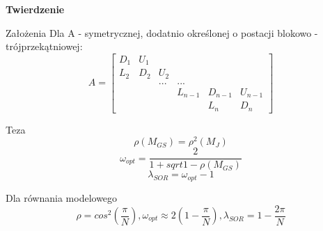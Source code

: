 \begin{frame}{}
  \textbf{Twierdzenie}
  \begin{block}{Założenia}
    Dla A - symetrycznej, dodatnio określonej o postacji blokowo - trójprzekątniowej:
    $$
    A=\begin{bmatrix}
    D_1 & U_1 &&&&\\
    L_2 & D_2 & U_2 &&& \\
    &&...&...&&\\
    &&&L_{n-1}&D_{n-1}&U_{n-1}\\
    &&&&L_n&D_n
    \end{bmatrix}
    $$
  \end{block}
\end{frame}

\begin{frame}
  \begin{block}{Teza}
    $$\rho(M_{GS})=\rho^2(M_J)$$
    $$\omega_{opt}=\frac{2}{1+sqrt{1-\rho(M_{GS})}}$$
    $$\lambda_{SOR}=\omega_{opt}-1$$
  \end{block}
  \begin{exampleblock}{Dla równania modelowego}
    $$\rho=cos^2(\frac{\pi}{N}), \omega_{opt}\approx2(1-\frac{\pi}{N}), \lambda_{SOR}=1-\frac{2\pi}{N}$$
  \end{exampleblock}
\end{frame}


